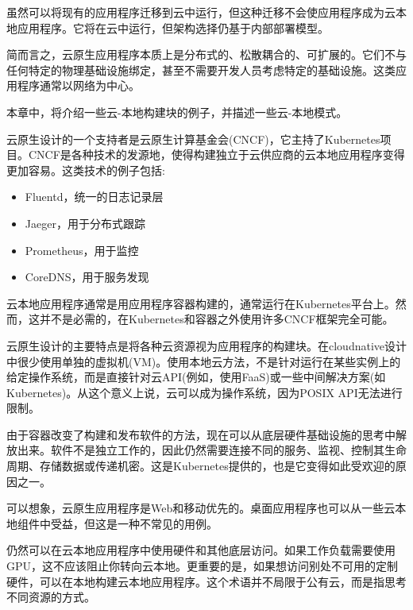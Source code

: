 

虽然可以将现有的应用程序迁移到云中运行，但这种迁移不会使应用程序成为云本地应用程序。它将在云中运行，但架构选择仍基于内部部署模型。

简而言之，云原生应用程序本质上是分布式的、松散耦合的、可扩展的。它们不与任何特定的物理基础设施绑定，甚至不需要开发人员考虑特定的基础设施。这类应用程序通常以网络为中心。

本章中，将介绍一些云-本地构建块的例子，并描述一些云-本地模式。


云原生设计的一个支持者是云原生计算基金会(CNCF)，它主持了Kubernetes项目。CNCF是各种技术的发源地，使得构建独立于云供应商的云本地应用程序变得更加容易。这类技术的例子包括:

\begin{itemize}
\item 
Fluentd，统一的日志记录层

\item 
Jaeger，用于分布式跟踪

\item 
Prometheus，用于监控

\item 
CoreDNS，用于服务发现
\end{itemize}

云本地应用程序通常是用应用程序容器构建的，通常运行在Kubernetes平台上。然而，这并不是必需的，在Kubernetes和容器之外使用许多CNCF框架完全可能。


云原生设计的主要特点是将各种云资源视为应用程序的构建块。在cloudnative设计中很少使用单独的虚拟机(VM)。使用本地云方法，不是针对运行在某些实例上的给定操作系统，而是直接针对云API(例如，使用FaaS)或一些中间解决方案(如Kubernetes)。从这个意义上说，云可以成为操作系统，因为POSIX API无法进行限制。

由于容器改变了构建和发布软件的方法，现在可以从底层硬件基础设施的思考中解放出来。软件不是独立工作的，因此仍然需要连接不同的服务、监视、控制其生命周期、存储数据或传递机密。这是Kubernetes提供的，也是它变得如此受欢迎的原因之一。

可以想象，云原生应用程序是Web和移动优先的。桌面应用程序也可以从一些云本地组件中受益，但这是一种不常见的用例。

仍然可以在云本地应用程序中使用硬件和其他底层访问。如果工作负载需要使用GPU，这不应该阻止你转向云本地。更重要的是，如果想访问别处不可用的定制硬件，可以在本地构建云本地应用程序。这个术语并不局限于公有云，而是指思考不同资源的方式。


